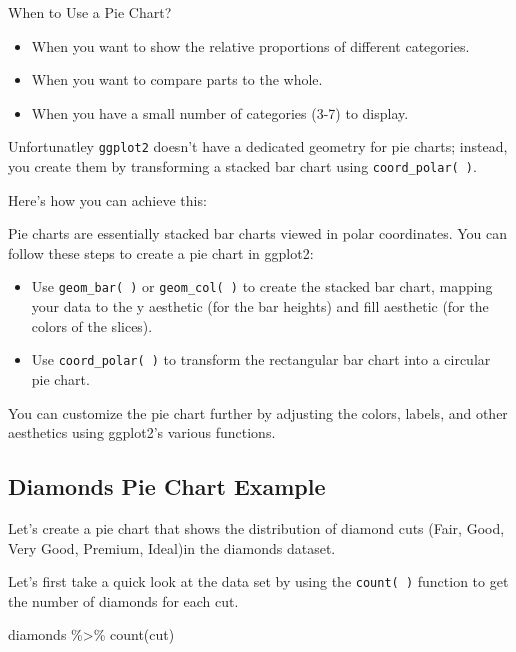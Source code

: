 \documentclass[
  letterpaper,
  DIV=11,
  numbers=noendperiod]{scrreprt}
\newenvironment{Shaded}{\begin{snugshade}}{\end{snugshade}}
\newcommand{\FunctionTok}[1]{\textcolor[rgb]{0.28,0.35,0.67}{#1}}
\newcommand{\NormalTok}[1]{\textcolor[rgb]{0.00,0.23,0.31}{#1}}
\newcommand{\SpecialCharTok}[1]{\textcolor[rgb]{0.37,0.37,0.37}{#1}}
\providecommand{\tightlist}{%
  \setlength{\itemsep}{0pt}\setlength{\parskip}{0pt}}\usepackage{longtable,booktabs,array}
\begin{document}
When to Use a Pie Chart?

\begin{itemize}
\tightlist
\item
  When you want to show the relative proportions of different
  categories.
\item
  When you want to compare parts to the whole.
\item
  When you have a small number of categories (3-7) to display.
\end{itemize}

Unfortunatley \texttt{ggplot2} doesn't have a dedicated geometry for pie
charts; instead, you create them by transforming a stacked bar chart
using \texttt{coord\_polar(\ )}.

Here's how you can achieve this:

Pie charts are essentially stacked bar charts viewed in polar
coordinates. You can follow these steps to create a pie chart in
ggplot2:

\begin{itemize}
\tightlist
\item
  Use \texttt{geom\_bar(\ )} or \texttt{geom\_col(\ )} to create the
  stacked bar chart, mapping your data to the y aesthetic (for the bar
  heights) and fill aesthetic (for the colors of the slices).
\item
  Use \texttt{coord\_polar(\ )} to transform the rectangular bar chart
  into a circular pie chart.
\end{itemize}

You can customize the pie chart further by adjusting the colors, labels,
and other aesthetics using ggplot2's various functions.

\subsection*{Diamonds Pie Chart
Example}\label{diamonds-pie-chart-example}

Let's create a pie chart that shows the distribution of diamond cuts
(Fair, Good, Very Good, Premium, Ideal)in the diamonds dataset.

Let's first take a quick look at the data set by using the
\texttt{count(\ )} function to get the number of diamonds for each cut.

\begin{Shaded}
\begin{Highlighting}[]
\NormalTok{diamonds }\SpecialCharTok{\%\textgreater{}\%} \FunctionTok{count}\NormalTok{(cut)}
\end{Highlighting}
\end{Shaded}
\end{document}
